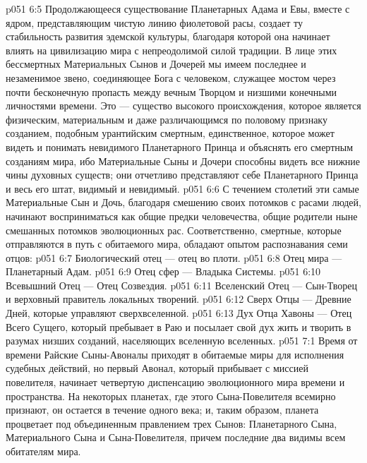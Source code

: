 \vs p051 6:5 \pc Продолжающееся существование Планетарных Адама и Евы, вместе с ядром, представляющим чистую линию фиолетовой расы, создает ту стабильность развития эдемской культуры, благодаря которой она начинает влиять на цивилизацию мира с непреодолимой силой традиции. В лице этих бессмертных Материальных Сынов и Дочерей мы имеем последнее и незаменимое звено, соединяющее Бога с человеком, служащее мостом через почти бесконечную пропасть между вечным Творцом и низшими конечными личностями времени. Это --- существо высокого происхождения, которое является физическим, материальным и даже различающимся по половому признаку созданием, подобным урантийским смертным, единственное, которое может видеть и понимать невидимого Планетарного Принца и объяснять его смертным созданиям мира, ибо Материальные Сыны и Дочери способны видеть все нижние чины духовных существ; они отчетливо представляют себе Планетарного Принца и весь его штат, видимый и невидимый.
\vs p051 6:6 С течением столетий эти самые Материальные Сын и Дочь, благодаря смешению своих потомков с расами людей, начинают восприниматься как общие предки человечества, общие родители ныне смешанных потомков эволюционных рас. Соответственно, смертные, которые отправляются в путь с обитаемого мира, обладают опытом распознавания семи отцов:
\vs p051 6:7 \pc {}\bibnobreakspace Биологический отец --- отец во плоти.
\vs p051 6:8 \bibnobreakspace Отец мира --- Планетарный Адам.
\vs p051 6:9 \bibnobreakspace Отец сфер --- Владыка Системы.
\vs p051 6:10 \bibnobreakspace Всевышний Отец --- Отец Созвездия.
\vs p051 6:11 \bibnobreakspace Вселенский Отец --- Сын\hyp{}Творец и верховный правитель локальных творений.
\vs p051 6:12 \bibnobreakspace Сверх Отцы --- Древние Дней, которые управляют сверхвселенной.
\vs p051 6:13 \bibnobreakspace Дух Отца Хавоны --- Отец Всего Сущего, который пребывает в Раю и посылает свой дух жить и творить в разумах низших созданий, населяющих вселенную вселенных.
\vs p051 7:1 Время от времени Райские Сыны\hyp{}Авоналы приходят в обитаемые миры для исполнения судебных действий, но первый Авонал, который прибывает с миссией повелителя, начинает четвертую диспенсацию эволюционного мира времени и пространства. На некоторых планетах, где этого Сына\hyp{}Повелителя всемирно признают, он остается в течение одного века; и, таким образом, планета процветает под объединенным правлением трех Сынов: Планетарного Сына, Материального Сына и Сына\hyp{}Повелителя, причем последние два видимы всем обитателям мира.
